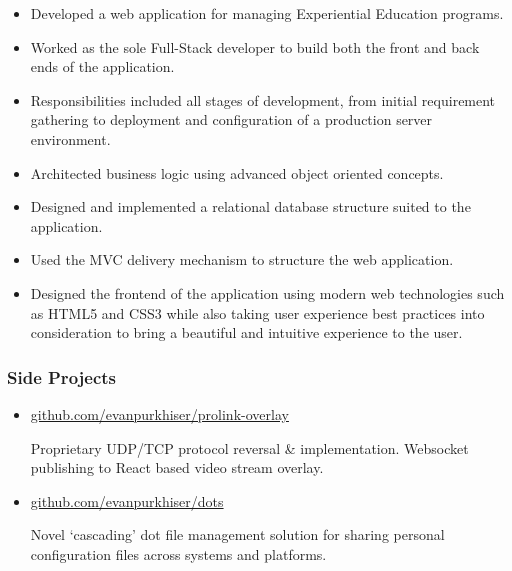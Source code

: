 \documentclass[letterpaper,10pt]{article}
\begin{document}
\begin{itemize}
\tightlist{}
\item
  Developed a web application for managing Experiential Education
  programs.
\item
  Worked as the sole Full-Stack developer to build both the front and
  back ends of the application.
\item
  Responsibilities included all stages of development, from initial
  requirement gathering to deployment and configuration of a production
  server environment.
\item
  Architected business logic using advanced object oriented concepts.
\item
  Designed and implemented a relational database structure suited to the
  application.
\item
  Used the MVC delivery mechanism to structure the web application.
\item
  Designed the frontend of the application using modern web technologies such
  as HTML5 and CSS3 while also taking user experience best practices into
  consideration to bring a beautiful and intuitive experience to the user.
\end{itemize}

\subsubsection{Side Projects}

\begin{itemize}
\item
  \href{https://github.com/evanpurkhiser/prolink-overlay}{github.com/evanpurkhiser/prolink-overlay}

  Proprietary UDP/TCP protocol reversal \& implementation. Websocket
  publishing to React based video stream overlay.
\item
  \href{https://github.com/evanpurkhiser/dots}{github.com/evanpurkhiser/dots}

  Novel `cascading' dot file management solution for sharing personal
  configuration files across systems and platforms.
\end{itemize}
\end{document}
